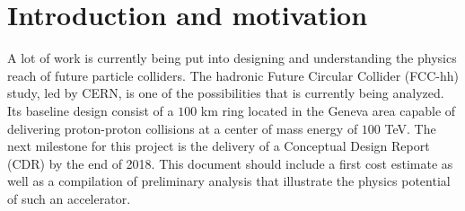
\section{Introduction and motivation}
\label{sec:intro}


A lot of work is currently being put into designing and understanding the physics reach of future particle colliders. The hadronic Future Circular Collider (FCC-hh) study, led by CERN, is one of the possibilities that is currently being analyzed. Its baseline design consist of a $100$ km ring located in the Geneva area capable of delivering proton-proton collisions at a center of mass energy of $100$ TeV. The next milestone for this project is the delivery of a Conceptual Design Report (CDR) by the end of 2018. This document should include a first cost estimate as well as a compilation of preliminary analysis that illustrate the physics potential of such an accelerator.

